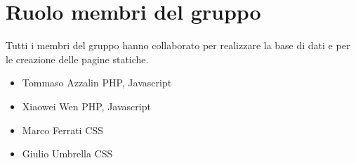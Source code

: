 \documentclass[1_relazione.tex]{subfiles}
\begin{document}
\section{Ruolo membri del gruppo}

Tutti i membri del gruppo hanno collaborato per realizzare la base di dati e per le creazione delle pagine statiche. 

\begin{itemize}
\item{Tommaso Azzalin} PHP, Javascript
\item{Xiaowei Wen} PHP, Javascript
\item{Marco Ferrati} CSS
\item{Giulio Umbrella} CSS
\end{itemize}
\end{document}

